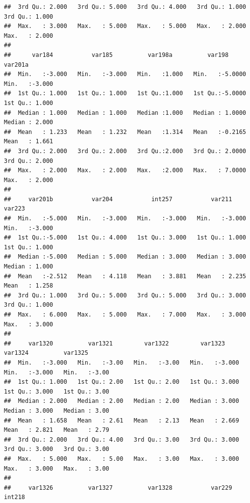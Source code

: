\documentclass[
]{book}
\begin{document}
\begin{verbatim}
##  3rd Qu.: 2.000   3rd Qu.: 5.000   3rd Qu.: 4.000   3rd Qu.: 1.000   3rd Qu.: 1.000  
##  Max.   : 3.000   Max.   : 5.000   Max.   : 5.000   Max.   : 2.000   Max.   : 2.000  
##                                                                                      
##      var184           var185          var198a          var198           var201a      
##  Min.   :-3.000   Min.   :-3.000   Min.   :1.000   Min.   :-5.0000   Min.   :-3.000  
##  1st Qu.: 1.000   1st Qu.: 1.000   1st Qu.:1.000   1st Qu.:-5.0000   1st Qu.: 1.000  
##  Median : 1.000   Median : 1.000   Median :1.000   Median : 1.0000   Median : 2.000  
##  Mean   : 1.233   Mean   : 1.232   Mean   :1.314   Mean   :-0.2165   Mean   : 1.661  
##  3rd Qu.: 2.000   3rd Qu.: 2.000   3rd Qu.:2.000   3rd Qu.: 2.0000   3rd Qu.: 2.000  
##  Max.   : 2.000   Max.   : 2.000   Max.   :2.000   Max.   : 7.0000   Max.   : 2.000  
##                                                                                      
##     var201b           var204           int257           var211           var223      
##  Min.   :-5.000   Min.   :-3.000   Min.   :-3.000   Min.   :-3.000   Min.   :-3.000  
##  1st Qu.:-5.000   1st Qu.: 4.000   1st Qu.: 3.000   1st Qu.: 1.000   1st Qu.: 1.000  
##  Median :-5.000   Median : 5.000   Median : 3.000   Median : 3.000   Median : 1.000  
##  Mean   :-2.512   Mean   : 4.118   Mean   : 3.881   Mean   : 2.235   Mean   : 1.258  
##  3rd Qu.: 1.000   3rd Qu.: 5.000   3rd Qu.: 5.000   3rd Qu.: 3.000   3rd Qu.: 1.000  
##  Max.   : 6.000   Max.   : 5.000   Max.   : 7.000   Max.   : 3.000   Max.   : 3.000  
##                                                                                      
##     var1320          var1321         var1322         var1323          var1324          var1325     
##  Min.   :-3.000   Min.   :-3.00   Min.   :-3.00   Min.   :-3.000   Min.   :-3.000   Min.   :-3.00  
##  1st Qu.: 1.000   1st Qu.: 2.00   1st Qu.: 2.00   1st Qu.: 3.000   1st Qu.: 3.000   1st Qu.: 3.00  
##  Median : 2.000   Median : 2.00   Median : 2.00   Median : 3.000   Median : 3.000   Median : 3.00  
##  Mean   : 1.658   Mean   : 2.61   Mean   : 2.13   Mean   : 2.669   Mean   : 2.821   Mean   : 2.79  
##  3rd Qu.: 2.000   3rd Qu.: 4.00   3rd Qu.: 3.00   3rd Qu.: 3.000   3rd Qu.: 3.000   3rd Qu.: 3.00  
##  Max.   : 5.000   Max.   : 5.00   Max.   : 3.00   Max.   : 3.000   Max.   : 3.000   Max.   : 3.00  
##                                                                                                    
##     var1326          var1327          var1328           var229           int218      

\end{verbatim}
\end{document}
